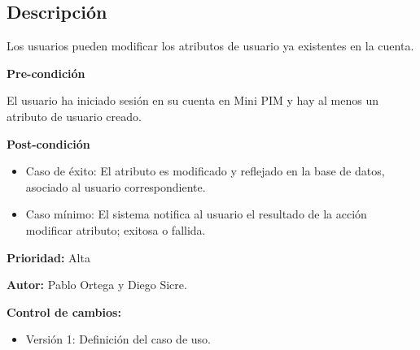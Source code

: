 
\subsection*{Descripción}
Los usuarios pueden modificar los atributos de usuario ya existentes en la cuenta.
\vspace{0.15cm}

\textbf{Pre-condición}\par
El usuario ha iniciado sesión en su cuenta en Mini PIM y hay al menos un atributo de usuario creado.\par
\vspace{0.15cm}

\textbf{Post-condición}
\begin{itemize}
    \item Caso de éxito: El atributo es modificado y reflejado en la base de datos, asociado al usuario correspondiente.
    \item Caso mínimo: El sistema notifica al usuario el resultado de la acción modificar atributo; exitosa o fallida.
\end{itemize}

\textbf{Prioridad: }
Alta
\vspace{0.15cm}

\textbf{Autor: }
Pablo Ortega y Diego Sicre.\par
\vspace{0.15cm}

\textbf{Control de cambios: }
\begin{itemize}
    \item Versión 1: Definición del caso de uso.
\end{itemize}

